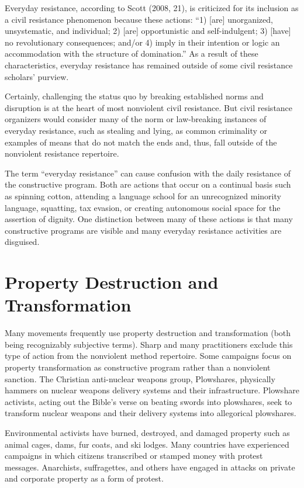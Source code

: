 \documentclass[twoside,a4paper,12pt,fleqn,openany]{extbook}
\begin{document}
Everyday resistance, according to Scott (2008, 21), is criticized for its inclusion as a civil resistance phenomenon because these actions: “1) [are] unorganized, unsystematic, and individual; 2) [are] opportunistic and self-indulgent; 3) [have] no revolutionary consequences; and/or 4) imply in their intention or logic an accommodation with the structure of domination.” As a result of these characteristics, everyday resistance has remained outside of some civil resistance scholars’ purview.

Certainly, challenging the status quo by breaking established norms and disruption is at the heart of most nonviolent civil resistance. But civil resistance organizers would consider many of the norm or law-breaking instances of everyday resistance, such as stealing and lying, as common criminality or examples of means that do not match the ends and, thus, fall outside of the nonviolent resistance repertoire.

The term “everyday resistance” can cause confusion with the daily resistance of the constructive program. Both are actions that occur on a continual basis such as spinning cotton, attending a language school for an unrecognized minority language, squatting, tax evasion, or creating autonomous social space for the assertion of dignity. One distinction between many of these actions is that many constructive programs are visible and many everyday resistance activities are disguised.

\section*{Property Destruction and Transformation}

Many movements frequently use property destruction and transformation (both being recognizably subjective terms). Sharp and many practitioners exclude this type of action from the nonviolent method repertoire. Some campaigns focus on property transformation as constructive program rather than a nonviolent sanction. The Christian anti-nuclear weapons group, Plowshares, physically hammers on nuclear weapons delivery systems and their infrastructure. Plowshare activists, acting out the Bible’s verse on beating swords into plowshares, seek to transform nuclear weapons and their delivery systems into allegorical plowshares.

Environmental activists have burned, destroyed, and damaged property such as animal cages, dams, fur coats, and ski lodges. Many countries have experienced campaigns in which citizens transcribed or stamped money with protest messages. Anarchists, suffragettes, and others have engaged in attacks on private and corporate property as a form of protest.
\end{document}

